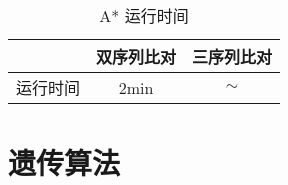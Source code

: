     \begin{table}[H]
        \centering
        \caption{A* 运行时间}\label{tab:astar}
        \begin{tabular}{ccc}
            \toprule
             & 双序列比对 & 三序列比对 \\
            \midrule
            运行时间 & 2min & $\sim$ \\
            \bottomrule
        \end{tabular}
    \end{table}

    \section{遗传算法}

    
    
    

